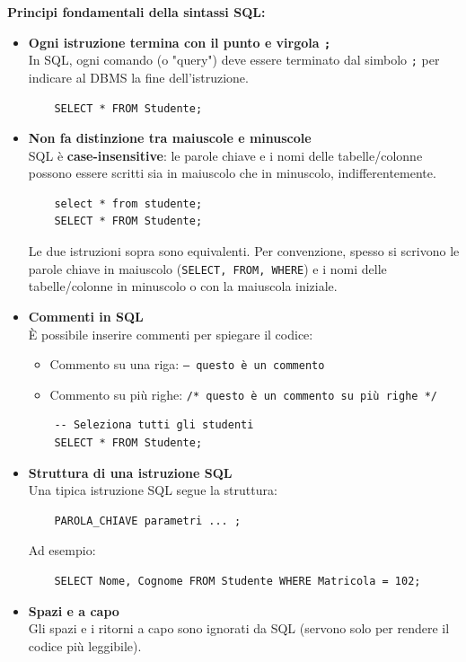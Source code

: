 \documentclass[a4paper,12pt]{article}
\newcommand{\code}[1]{\texttt{#1}}
\begin{document}
\textbf{Principi fondamentali della sintassi SQL:}
\begin{itemize}
    \item \textbf{Ogni istruzione termina con il punto e virgola \code{;}}\\
    In SQL, ogni comando (o "query") deve essere terminato dal simbolo \code{;} per indicare al DBMS la fine dell'istruzione.
    \begin{verbatim}
    SELECT * FROM Studente;
    \end{verbatim}
    \item \textbf{Non fa distinzione tra maiuscole e minuscole}\\
    SQL è \textbf{case-insensitive}: le parole chiave e i nomi delle tabelle/colonne possono essere scritti sia in maiuscolo che in minuscolo, indifferentemente.
    \begin{verbatim}
    select * from studente;
    SELECT * FROM Studente;
    \end{verbatim}
    Le due istruzioni sopra sono equivalenti. Per convenzione, spesso si scrivono le parole chiave in maiuscolo (\code{SELECT, FROM, WHERE}) e i nomi delle tabelle/colonne in minuscolo o con la maiuscola iniziale.
    \item \textbf{Commenti in SQL}\\
    È possibile inserire commenti per spiegare il codice:
    \begin{itemize}
        \item Commento su una riga: \code{-- questo è un commento}
        \item Commento su più righe: \code{/* questo è un commento su più righe */}
    \end{itemize}
    \begin{verbatim}
    -- Seleziona tutti gli studenti
    SELECT * FROM Studente;
    \end{verbatim}
    \item \textbf{Struttura di una istruzione SQL}\\
    Una tipica istruzione SQL segue la struttura:
    \begin{verbatim}
    PAROLA_CHIAVE parametri ... ;
    \end{verbatim}
    Ad esempio:
    \begin{verbatim}
    SELECT Nome, Cognome FROM Studente WHERE Matricola = 102;
    \end{verbatim}
    \item \textbf{Spazi e a capo}\\
    Gli spazi e i ritorni a capo sono ignorati da SQL (servono solo per rendere il codice più leggibile).
\end{itemize}
\end{document}
